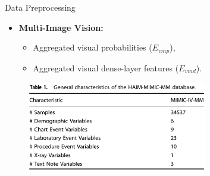 \documentclass{sintefbeamer}
\theoremstyle{definition}
\begin{document}
\begin{frame}{Data Preprocessing}
\small
\begin{itemize}
    
    \item \textbf{Multi-Image Vision:} 
    \begin{itemize}
        \item Aggregated visual probabilities (\(E_{vmp}\)),
        \item Aggregated visual dense-layer features (\(E_{vmd}\)).
    \end{itemize}
\end{itemize}
\begin{figure}[htbp]
  \centering
  \includegraphics[width=0.7\textwidth]{images/table1}
  \label{fig:ex1}	
\end{figure}
\end{frame}
\end{document}
